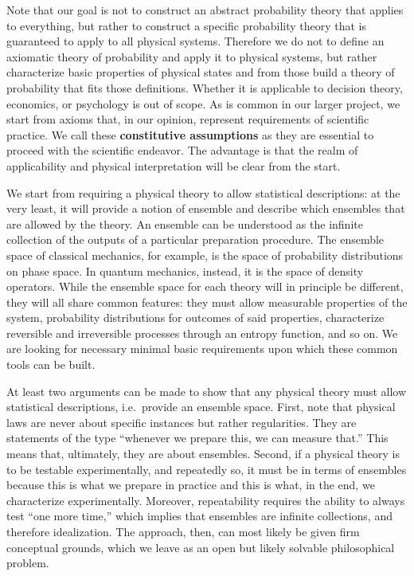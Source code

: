 \documentclass[10pt,twocolumn, nofootinbib]{revtex4-2}
\begin{document}
Note that our goal is not to construct an abstract probability theory that applies to everything, but rather to construct a specific probability theory that is guaranteed to apply to all physical systems. Therefore we do not to define an axiomatic theory of probability and apply it to physical systems, but rather characterize basic properties of physical states and from those build a theory of probability that fits those definitions. Whether it is applicable to decision theory, economics, or psychology is out of scope. As is common in our larger project, we start from axioms that, in our opinion, represent requirements of scientific practice. We call these \textbf{constitutive assumptions} as they are essential to proceed with the scientific endeavor. The advantage is that the realm of applicability and physical interpretation will be clear from the start. 

We start from requiring a physical theory to allow statistical descriptions: at the very least, it will provide a notion of ensemble and describe which ensembles that are allowed by the theory. An ensemble can be understood as the infinite collection of the outputs of a particular preparation procedure. The ensemble space of classical mechanics, for example, is the space of probability distributions on phase space. In quantum mechanics, instead, it is the space of density operators. While the ensemble space for each theory will in principle be different, they will all share common features: they must allow measurable properties of the system, probability distributions for outcomes of said properties, characterize reversible and irreversible processes through an entropy function, and so on. We are looking for necessary minimal basic requirements upon which these common tools can be built.

At least two arguments can be made to show that any physical theory must allow statistical descriptions, i.e.~provide an ensemble space. First, note that physical laws are never about specific instances but rather regularities. They are statements of the type ``whenever we prepare this, we can measure that.'' This means that, ultimately, they are about ensembles. Second, if a physical theory is to be testable experimentally, and repeatedly so, it must be in terms of ensembles because this is what we prepare in practice and this is what, in the end, we characterize experimentally. Moreover, repeatability requires the ability to always test ``one more time,'' which implies that ensembles are infinite collections, and therefore idealization. The approach, then, can most likely be given firm conceptual grounds, which we leave as an open but likely solvable philosophical problem.
\end{document}
